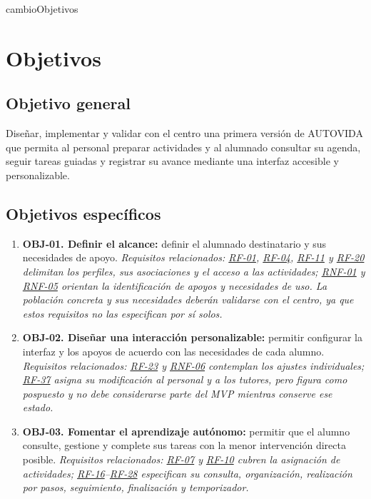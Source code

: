 \newpage
\begin{cambiocontenido}{cambioObjetivos}
\section{Objetivos}

\subsection{Objetivo general}
Diseñar, implementar y validar con el centro una primera versión de AUTOVIDA que permita al personal preparar actividades y al alumnado consultar su agenda, seguir tareas guiadas y registrar su avance mediante una interfaz accesible y personalizable.

\subsection{Objetivos específicos}
\begin{enumerate}[leftmargin=*]
  \item \textbf{OBJ-01. Definir el alcance:} definir el alumnado destinatario y sus necesidades de apoyo. \emph{Requisitos relacionados: \hyperlink{rf-01}{RF-01}, \hyperlink{rf-04}{RF-04}, \hyperlink{rf-11}{RF-11} y \hyperlink{rf-20}{RF-20} delimitan los perfiles, sus asociaciones y el acceso a las actividades; \hyperlink{rnf-01}{RNF-01} y \hyperlink{rnf-05}{RNF-05} orientan la identificación de apoyos y necesidades de uso. La población concreta y sus necesidades deberán validarse con el centro, ya que estos requisitos no las especifican por sí solos.}
  \item \textbf{OBJ-02. Diseñar una interacción personalizable:} permitir configurar la interfaz y los apoyos de acuerdo con las necesidades de cada alumno. \emph{Requisitos relacionados: \hyperlink{rf-23}{RF-23} y \hyperlink{rnf-06}{RNF-06} contemplan los ajustes individuales; \hyperlink{rf-37}{RF-37} asigna su modificación al personal y a los tutores, pero figura como pospuesto y no debe considerarse parte del MVP mientras conserve ese estado.}
  \item \textbf{OBJ-03. Fomentar el aprendizaje autónomo:} permitir que el alumno consulte, gestione y complete sus tareas con la menor intervención directa posible. \emph{Requisitos relacionados: \hyperlink{rf-07}{RF-07} y \hyperlink{rf-10}{RF-10} cubren la asignación de actividades; \hyperlink{rf-16}{RF-16}--\hyperlink{rf-28}{RF-28} especifican su consulta, organización, realización por pasos, seguimiento, finalización y temporizador.}

\end{enumerate}
\end{cambiocontenido}
